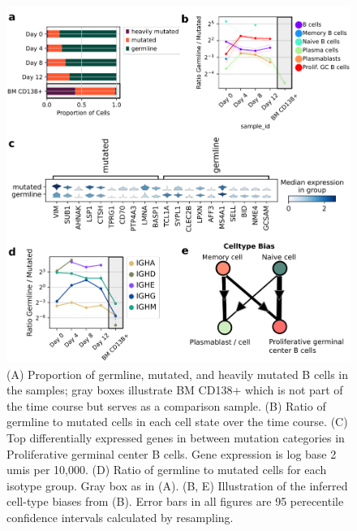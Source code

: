 \begin{figure}[hbt!]
\centering
\includegraphics[width=14cm, keepaspectratio]{figs/paper2/fig2_bcd.png}
\caption[Characterization of cell-intrinsic phenotypes using VDJ mutation status.]{(A) Proportion of germline, mutated, and heavily mutated B cells in the samples; gray boxes illustrate BM CD138+ which is not part of the time course but serves as a comparison sample. (B) Ratio of germline to mutated cells in each cell state over the time course. (C) Top differentially expressed genes in between mutation categories in Proliferative germinal center B cells. Gene expression is log base 2 umis per 10,000. (D) Ratio of germline to mutated cells for each isotype group. Gray box as in (A). (B, E) Illustration of the inferred cell-type biases from (B). Error bars in all figures are 95 perecentile confidence intervals calculated by resampling.}
\label{fig:paper2_fig_2}
\end{figure}


